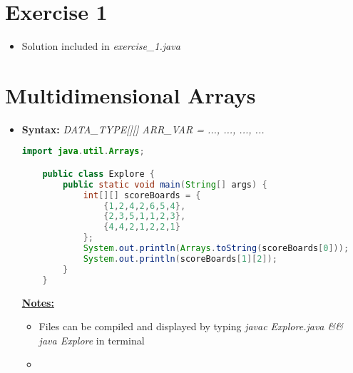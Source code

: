 \documentclass[12pt]{article}
\begin{document}
\bigskip

\section{Exercise 1}

\bigskip

\begin{itemize}
    \item Solution included in \textit{exercise\_1.java}
\end{itemize}

\bigskip

\section{Multidimensional Arrays}

\bigskip

\begin{itemize}
    \item \textbf{Syntax:} \textit{DATA\_TYPE[][] ARR\_VAR = { {...}, {...}, ..., {...} }}

    \begin{lstlisting}[language=Java, caption={lesson\_05/Explore.java}]
    import java.util.Arrays;

    public class Explore {
        public static void main(String[] args) {
            int[][] scoreBoards = {
                {1,2,4,2,6,5,4},
                {2,3,5,1,1,2,3},
                {4,4,2,1,2,2,1}
            };
            System.out.println(Arrays.toString(scoreBoards[0]));
            System.out.println(scoreBoards[1][2]);
        }
    }
    \end{lstlisting}


    \underline{\textbf{Notes:}}

    \bigskip

    \begin{itemize}
        \item Files can be compiled and displayed by typing \textit{javac Explore.java \&\& java Explore}
        in terminal
        \item
    \end{itemize}
\end{itemize}
\end{document}
